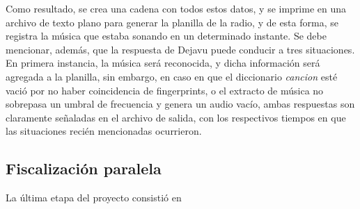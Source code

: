 Como resultado, se crea una cadena con todos estos datos, y se imprime en una archivo de texto plano para generar la planilla de la radio, y de esta forma, se registra la música que estaba sonando en un determinado instante. Se debe mencionar, además, que la respuesta de Dejavu puede conducir a tres situaciones. En primera instancia, la música será reconocida, y dicha información será agregada a la planilla, sin embargo, en caso en que el diccionario \textit{cancion} esté vació por no haber coincidencia de fingerprints, o el extracto de música no sobrepasa un umbral de frecuencia y genera un audio vacío, ambas respuestas son claramente señaladas en el archivo de salida, con los respectivos tiempos en que las situaciones recién mencionadas ocurrieron.


\subsection{Fiscalización paralela}
La última etapa del proyecto consistió en 






